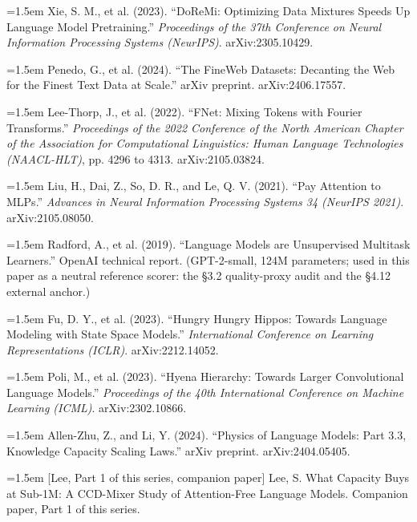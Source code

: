 \documentclass[11pt]{article}
\begin{document}
\par\hangindent=1.5em Xie, S. M., et al. (2023). ``DoReMi: Optimizing Data Mixtures Speeds Up Language Model Pretraining.'' \emph{Proceedings of the 37th Conference on Neural Information Processing Systems (NeurIPS)}. arXiv:2305.10429.

\par\hangindent=1.5em Penedo, G., et al. (2024). ``The FineWeb Datasets: Decanting the Web for the Finest Text Data at Scale.'' arXiv preprint. arXiv:2406.17557.

\par\hangindent=1.5em Lee-Thorp, J., et al. (2022). ``FNet: Mixing Tokens with Fourier Transforms.'' \emph{Proceedings of the 2022 Conference of the North American Chapter of the Association for Computational Linguistics: Human Language Technologies (NAACL-HLT)}, pp. 4296 to 4313. arXiv:2105.03824.

\par\hangindent=1.5em Liu, H., Dai, Z., So, D. R., and Le, Q. V. (2021). ``Pay Attention to MLPs.'' \emph{Advances in Neural Information Processing Systems 34 (NeurIPS 2021)}. arXiv:2105.08050.

\par\hangindent=1.5em Radford, A., et al. (2019). ``Language Models are Unsupervised Multitask Learners.'' OpenAI technical report. (GPT-2-small, 124M parameters; used in this paper as a neutral reference scorer: the \S3.2 quality-proxy audit and the \S4.12 external anchor.)

\par\hangindent=1.5em Fu, D. Y., et al. (2023). ``Hungry Hungry Hippos: Towards Language Modeling with State Space Models.'' \emph{International Conference on Learning Representations (ICLR)}. arXiv:2212.14052.

\par\hangindent=1.5em Poli, M., et al. (2023). ``Hyena Hierarchy: Towards Larger Convolutional Language Models.'' \emph{Proceedings of the 40th International Conference on Machine Learning (ICML)}. arXiv:2302.10866.

\par\hangindent=1.5em Allen-Zhu, Z., and Li, Y. (2024). ``Physics of Language Models: Part 3.3, Knowledge Capacity Scaling Laws.'' arXiv preprint. arXiv:2404.05405.

\par\hangindent=1.5em [Lee, Part 1 of this series, companion paper] Lee, S. What Capacity Buys at Sub-1M: A CCD-Mixer Study of Attention-Free Language Models. Companion paper, Part 1 of this series.
\end{document}
